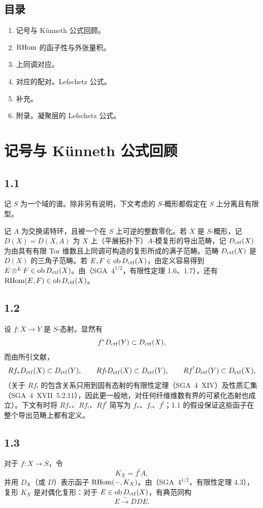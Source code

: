\subsection*{目录}
\begin{enumerate}[label=\arabic*.]
\item 记号与 Künneth 公式回顾。
\item $\mathrm{RHom}$ 的函子性与外张量积。
\item 上同调对应。
\item 对应的配对。Lefschetz 公式。
\item 补充。
\item 附录。凝聚层的 Lefschetz 公式。
\end{enumerate}

\section{记号与 Künneth 公式回顾}

\subsection*{1.1}
记 $S$ 为一个域的谱。除非另有说明，下文考虑的 $S$-概形都假定在 $S$ 上分离且有限型。

记 $A$ 为交换诺特环，且被一个在 $S$ 上可逆的整数零化。若 $X$ 是 $S$-概形，记 $D(X)=D(X,A)$ 为 $X$ 上（平展拓扑下）$A$-模复形的导出范畴，记 $D_{\mathrm{ctf}}(X)$ 为由具有有限 Tor 维数且上同调可构造的复形所成的满子范畴。范畴 $D_{\mathrm{ctf}}(X)$ 是 $D(X)$ 的三角子范畴。若 $E,F\in\operatorname{ob} D_{\mathrm{ctf}}(X)$，由定义容易得到 $E\otimes^L F\in\operatorname{ob} D_{\mathrm{ctf}}(X)$。由（SGA~$4^{1/2}$，有限性定理 1.6、1.7），还有 $\mathrm{RHom}(E,F)\in\operatorname{ob} D_{\mathrm{ctf}}(X)$。

\subsection*{1.2}
设 $f:X\to Y$ 是 $S$-态射。显然有
\[
f^{*}D_{\mathrm{ctf}}(Y) \subset D_{\mathrm{ctf}}(X),
\]
而由所引文献，
\[
Rf_{*}D_{\mathrm{ctf}}(X) \subset D_{\mathrm{ctf}}(Y),\qquad
Rf_{!}D_{\mathrm{ctf}}(X) \subset D_{\mathrm{ctf}}(Y),\qquad
Rf^{!}D_{\mathrm{ctf}}(Y) \subset D_{\mathrm{ctf}}(X),
\]
（关于 $Rf_{!}$ 的包含关系只用到固有态射的有限性定理（SGA~4~XIV）及性质汇集（SGA~4~XVII~5.2.11），因此更一般地，对任何纤维维数有界的可紧化态射也成立）。下文有时将 $Rf_{*}$、$Rf_{!}$、$Rf^{!}$ 简写为 $f_{*}$、$f_{!}$、$f^{!}$；1.1 的假设保证这些函子在整个导出范畴上都有定义。

\subsection*{1.3}
对于 $f:X\to S$，令
\[
K_X=f^{!}A,
\]
并用 $D_X$（或 $D$）表示函子 $\mathrm{RHom}(-,K_X)$。由（SGA~$4^{1/2}$，有限性定理 4.3），复形 $K_X$ 是对偶化复形：对于 $E\in\operatorname{ob} D_{\mathrm{ctf}}(X)$，有典范同构
\[
E \xrightarrow{\sim} DDE.
\]


